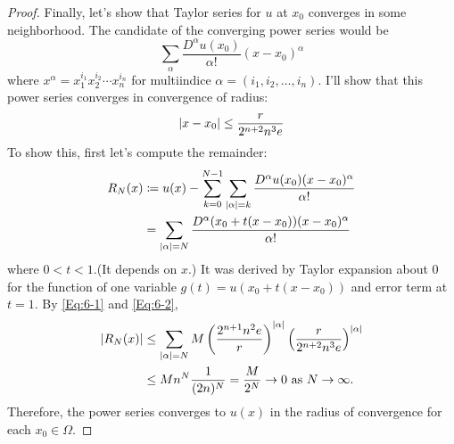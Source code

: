 \documentclass{article}
\newcommand*\Laplace{\mathop{}\!\mathbin\bigtriangleup}
\begin{document}
\begin{enumerate}
\begin{proof}
Finally, let's show that Taylor series for $u$ at $x_0$ converges in some neighborhood. The candidate of the converging power series would be
\begin{equation*}
\sum\limits_\alpha \frac{D^\alpha u(x_0)}{\alpha !}(x-x_0)^\alpha
\end{equation*}
where $x^\alpha=x_1^{i_1}x_2^{i_2}\cdots x_n^{i_n}$ for multiindice $\alpha=(i_1,i_2,\ldots,i_n)$. I'll show that this power series converges in convergence of radius:
\begin{equation}\label{Eq:6-2}
\abs{x-x_0}\leq \frac{r}{2^{n+2}n^3e}
\end{equation}
To show this, first let's compute the remainder:
\begin{equation*}
\begin{split}
R_N(x)&\coloneqq u(x)-\sum\limits_{k=0}^{N-1}\sum\limits_{\abs{\alpha}=k} \frac{D^\alpha u(x_0)(x-x_0)^\alpha}{\alpha !}\\
&=\sum\limits_{\abs{\alpha}=N}\frac{D^\alpha(x_0+t(x-x_0))(x-x_0)^\alpha}{\alpha !}
\end{split}
\end{equation*}
where $0<t<1$.(It depends on $x$.) It was derived by Taylor expansion about 0 for the function of one variable $g(t)=u(x_0+t(x-x_0))$ and error term at $t=1$. By \eqref{Eq:6-1} and \eqref{Eq:6-2}, 
\begin{equation*}
\begin{split}
\abs{R_N(x)}&\leq \sum\limits_{\abs{\alpha}=N} M \left(\frac{2^{n+1}n^2e}{r}\right)^\abs{\alpha}\left(\frac{r}{2^{n+2}n^3 e}\right)^\abs{\alpha}\\
&\leq M n^N\frac{1}{(2n)^N}=\frac{M}{2^N}\rightarrow 0 \textrm{ as }N\rightarrow\infty.
\end{split}
\end{equation*}
Therefore, the power series converges to $u(x)$ in the radius of convergence for each $x_0\in \Omega$.
\end{proof}

\end{enumerate}
\end{document}
